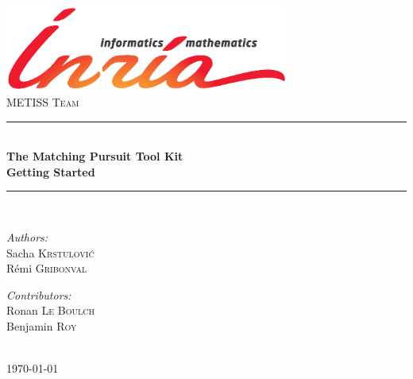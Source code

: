 \documentclass[11pt,a4paper]{report}
\begin{document}
\newcommand{\HRule}{\rule{\linewidth}{0.5mm}}
\begin{titlepage}
	\begin{center}
		\includegraphics[width=0.7\textwidth]{Images/logo.eps}\\[1cm]    
		\textsc{\Large METISS Team}\\[0.5cm]
		\HRule \\[0.4cm]
		{\huge \bfseries The Matching Pursuit Tool Kit\\[1cm] 
		\fontsize{50}{70}\selectfont Getting Started}\\[0.4cm]
		\HRule \\[1.5cm]
		\begin{minipage}{0.4\textwidth}
			\begin{flushleft} \large
				\emph{Authors:}\\
				Sacha \textsc{Krstulovi\'c}\\
				R\'emi \textsc{Gribonval}
			\end{flushleft}
		\end{minipage}
		\begin{minipage}{0.4\textwidth}
			\begin{flushright} \large
				\emph{Contributors:} \\
				Ronan \textsc{Le Boulch}\\
				Benjamin \textsc{Roy}\\
			\end{flushright}
		\end{minipage}\\[3cm]
		\vfill
		{\large \today}
	\end{center}
\end{titlepage}

\tableofcontents

\vfill

\clearpage



\end{document}
